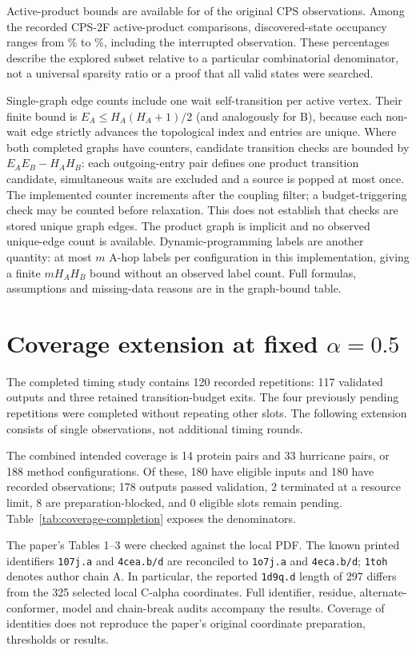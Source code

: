 Active-product bounds are available for \ActiveAvailable{} of the \GraphComparisons{} original CPS observations. Among the recorded CPS-2F active-product comparisons, discovered-state occupancy ranges from \ActiveTwoMin\% to \ActiveTwoMax\%, including the interrupted observation. These percentages describe the explored subset relative to a particular combinatorial denominator, not a universal sparsity ratio or a proof that all valid states were searched.

Single-graph edge counts include one wait self-transition per active vertex. Their finite bound is $E_A\leq H_A(H_A+1)/2$ (and analogously for B), because each non-wait edge strictly advances the topological index and entries are unique. Where both completed graphs have counters, candidate transition checks are bounded by $E_AE_B-H_AH_B$: each outgoing-entry pair defines one product transition candidate, simultaneous waits are excluded and a source is popped at most once. The implemented counter increments after the coupling filter; a budget-triggering check may be counted before relaxation. This does not establish that checks are stored unique graph edges. The product graph is implicit and no observed unique-edge count is available. Dynamic-programming labels are another quantity: at most $m$ A-hop labels per configuration in this implementation, giving a finite $mH_AH_B$ bound without an observed label count. Full formulas, assumptions and missing-data reasons are in the graph-bound table.


\section{Coverage extension at fixed $\alpha=0.5$}
\label{sec:coverage-extension}
The completed timing study contains 120 recorded repetitions: 117 validated outputs and three retained transition-budget exits. The four previously pending repetitions were completed without repeating other slots. The following extension consists of single observations, not additional timing rounds.

The combined intended coverage is 14 protein pairs and 33 hurricane pairs, or 188 method configurations. Of these, 180 have eligible inputs and 180 have recorded observations; 178 outputs passed validation, 2 terminated at a resource limit, 8 are preparation-blocked, and 0 eligible slots remain pending. Table~\ref{tab:coverage-completion} exposes the denominators.



The paper's Tables 1--3 were checked against the local PDF. The known printed identifiers \texttt{107j.a} and \texttt{4cea.b/d} are reconciled to \texttt{1o7j.a} and \texttt{4eca.b/d}; \texttt{1toh} denotes author chain A. In particular, the reported \texttt{1d9q.d} length of 297 differs from the 325 selected local C-alpha coordinates. Full identifier, residue, alternate-conformer, model and chain-break audits accompany the results. Coverage of identities does not reproduce the paper's original coordinate preparation, thresholds or results.


